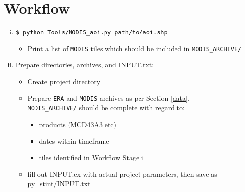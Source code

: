 \documentclass[twoside,a4paper]{refart}
\begin{document}
\section{Workflow}\label{run}
\begin{enumerate}[i)]
\item
    \texttt{\$ python Tools/MODIS\_aoi.py path/to/aoi.shp}
    \begin{itemize}
    \item
        Print a list of \texttt{MODIS} tiles which should be included in 
        \texttt{MODIS\_ARCHIVE/}
    \end{itemize}
\item 
    Prepare directories, archives, and INPUT.txt:
    \begin{itemize}
    \item
        Create project directory
    \item
        Prepare \texttt{ERA} and \texttt{MODIS} archives 
        as per Section \ref{data}.  \\
        \texttt{MODIS\_ARCHIVE/} should be complete
        with regard to:
        \begin{itemize}
        \item
            products (MCD43A3 etc)
        \item
            dates within timeframe
        \item
            tiles identified in Workflow Stage i
        \end{itemize}
    \item
        fill out INPUT.ex with actual project parameters, 
        then save as py\_stint/INPUT.txt
    \end{itemize}

\end{enumerate}
\end{document}
